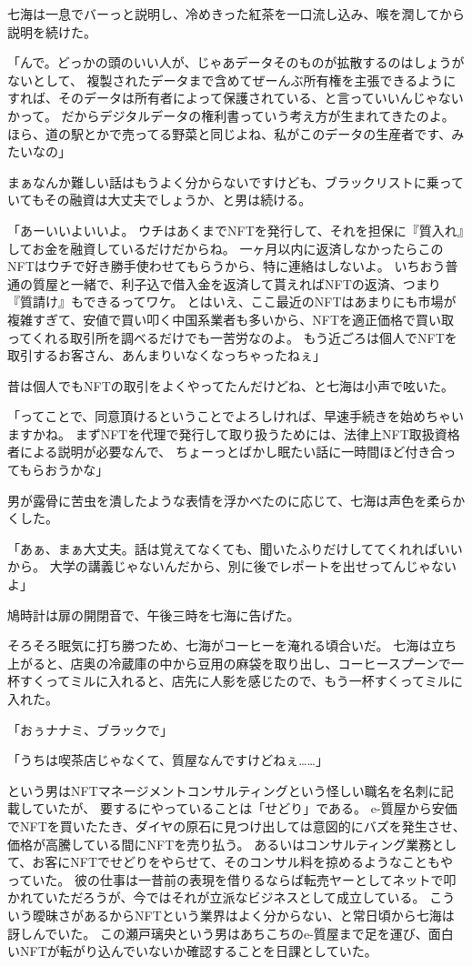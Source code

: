 七海は一息でバーっと説明し、冷めきった紅茶を一口流し込み、喉を潤してから説明を続けた。

「んで。どっかの頭のいい人が、じゃあデータそのものが拡散するのはしょうがないとして、
複製されたデータまで含めてぜーんぶ所有権を主張できるようにすれば、そのデータは所有者によって保護されている、と言っていいんじゃないかって。
だからデジタルデータの権利書っていう考え方が生まれてきたのよ。
ほら、道の駅とかで売ってる野菜と同じよね、私がこのデータの生産者です、みたいなの」

まぁなんか難しい話はもうよく分からないですけども、ブラックリストに乗っていてもその融資は大丈夫でしょうか、と男は続ける。

「あーいいよいいよ。
ウチはあくまでNFTを発行して、それを担保に『質入れ』してお金を融資しているだけだからね。
一ヶ月以内に返済しなかったらこのNFTはウチで好き勝手使わせてもらうから、特に連絡はしないよ。
いちおう普通の質屋と一緒で、利子込で借入金を返済して貰えればNFTの返済、つまり『質請け』もできるってワケ。
とはいえ、ここ最近のNFTはあまりにも市場が複雑すぎて、安値で買い叩く中国系業者も多いから、NFTを適正価格で買い取ってくれる取引所を調べるだけでも一苦労なのよ。
もう近ごろは個人でNFTを取引するお客さん、あんまりいなくなっちゃったねぇ」

昔は個人でもNFTの取引をよくやってたんだけどね、と七海は小声で呟いた。

「ってことで、同意頂けるということでよろしければ、早速手続きを始めちゃいますかね。
まずNFTを代理で発行して取り扱うためには、法律上NFT取扱資格者による説明が必要なんで、
ちょーっとばかし眠たい話に一時間ほど付き合ってもらおうかな」

男が露骨に苦虫を潰したような表情を浮かべたのに応じて、七海は声色を柔らかくした。

「あぁ、まぁ大丈夫。話は覚えてなくても、聞いたふりだけしててくれればいいから。
大学の講義じゃないんだから、別に後でレポートを出せってんじゃないよ」

\sectionbreak

鳩時計は扉の開閉音で、午後三時を七海に告げた。

そろそろ眠気に打ち勝つため、七海がコーヒーを淹れる頃合いだ。
七海は立ち上がると、店奥の冷蔵庫の中から豆用の麻袋を取り出し、コーヒースプーンで一杯すくってミルに入れると、店先に人影を感じたので、もう一杯すくってミルに入れた。

「おぅナナミ、ブラックで」

「うちは喫茶店じゃなくて、質屋なんですけどねぇ……」

という男はNFTマネージメントコンサルティングという怪しい職名を名刺に記載していたが、
要するにやっていることは「せどり」である。
e-質屋から安価でNFTを買いたたき、ダイヤの原石に見つけ出しては意図的にバズを発生させ、価格が高騰している間にNFTを売り払う。
あるいはコンサルティング業務として、お客にNFTでせどりをやらせて、そのコンサル料を掠めるようなこともやっていた。
彼の仕事は一昔前の表現を借りるならば転売ヤーとしてネットで叩かれていただろうが、今ではそれが立派なビジネスとして成立している。
こういう曖昧さがあるからNFTという業界はよく分からない、と常日頃から七海は訝しんでいた。
この瀬戸璃央という男はあちこちのe-質屋まで足を運び、面白いNFTが転がり込んでいないか確認することを日課としていた。

